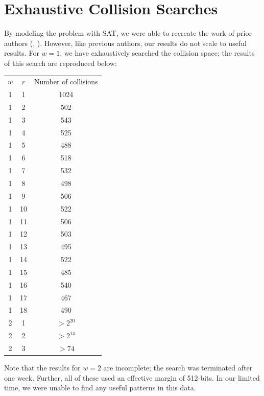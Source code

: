 \documentclass[10pt,twocolumn,twoside]{pnas-new}
\begin{document}


\section{Exhaustive Collision Searches} \label{sec:search}

By modeling the problem with SAT, we were able to recreate the work of prior
authors (\cite{Homsirikamol2012}, \cite{cryptoeprint:2010:285}). However, like
previous authors, our results do not scale to useful results. For $w=1$, we
have exhaustively searched the collision space; the results of this search are
reproduced below:

\begin{tabular}{c c c} \label{tab:s:1}
    $w$ & $r$ & Number of collisions \\
    1 & 1 & 1024 \\
    1 & 2 & 502 \\
    1 & 3 & 543 \\
    1 & 4 & 525 \\
    1 & 5 & 488 \\
    1 & 6 & 518 \\
    1 & 7 & 532 \\
    1 & 8 & 498 \\
    1 & 9 & 506 \\
    1 & 10 & 522 \\
    1 & 11 & 506 \\
    1 & 12 & 503 \\
    1 & 13 & 495 \\
    1 & 14 & 522 \\
    1 & 15 & 485 \\
    1 & 16 & 540 \\
    1 & 17 & 467 \\
    1 & 18 & 490 \\
    2 & 1 & $ > 2^{20}$ \\
    2 & 2 & $ > 2^{14}$ \\
    2 & 3 & $ > 74$ \\
\end{tabular}

Note that the results for $w=2$ are incomplete; the search was terminated
after one week. Further, all of these used an effective margin of 512-bits.
In our limited time, we were unable to find any useful patterns in this data.

\end{document}
